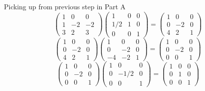 \documentclass{article}
\begin{document}
Picking up from previous step in Part A
\[
    \begin{pmatrix}
        1 & 0 & 0 \\
        1 & -2 & -2 \\
        3 & 2 & 3
    \end{pmatrix}
    \begin{pmatrix}
        1 & 0 & 0 \\
        1/2 & 1 & 0 \\
        0 & 0 & 1
    \end{pmatrix}
    =
    \begin{pmatrix}
        1 & 0 & 0 \\
        0 & -2 & 0 \\
        4 & 2 & 1
    \end{pmatrix}
\]
\[
    \begin{pmatrix}
        1 & 0 & 0 \\
        0 & -2 & 0 \\
        4 & 2 & 1
    \end{pmatrix}
    \begin{pmatrix}
        1 & 0 & 0 \\
        0 & -2 & 0 \\
        -4 & -2 & 1
    \end{pmatrix}
    =
    \begin{pmatrix}
        1 & 0 & 0 \\
        0 & -2 & 0 \\
        0 & 0 & 1
    \end{pmatrix}
\]
\[
    \begin{pmatrix}
        1 & 0 & 0 \\
        0 & -2 & 0 \\
        0 & 0 & 1
    \end{pmatrix}
    \begin{pmatrix}
        1 & 0 & 0 \\
        0 & -1/2 & 0 \\
        0 & 0 & 1
    \end{pmatrix}
    =
    \begin{pmatrix}
        1 & 0 & 0 \\
        0 & 1 & 0 \\
        0 & 0 & 1
    \end{pmatrix}
\]
\end{document}

